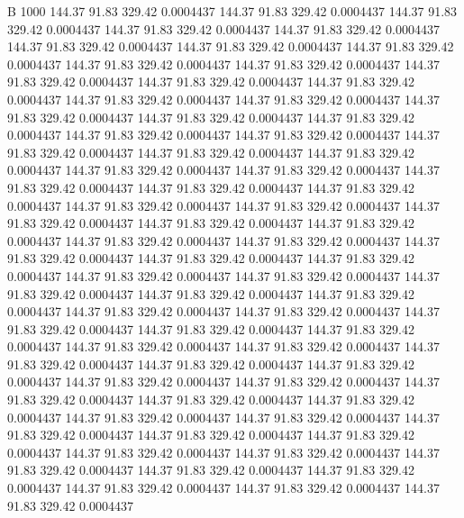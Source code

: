 


B 1000
 144.37   91.83  329.42   0.0004437
 144.37   91.83  329.42   0.0004437
 144.37   91.83  329.42   0.0004437
 144.37   91.83  329.42   0.0004437
 144.37   91.83  329.42   0.0004437
 144.37   91.83  329.42   0.0004437
 144.37   91.83  329.42   0.0004437
 144.37   91.83  329.42   0.0004437
 144.37   91.83  329.42   0.0004437
 144.37   91.83  329.42   0.0004437
 144.37   91.83  329.42   0.0004437
 144.37   91.83  329.42   0.0004437
 144.37   91.83  329.42   0.0004437
 144.37   91.83  329.42   0.0004437
 144.37   91.83  329.42   0.0004437
 144.37   91.83  329.42   0.0004437
 144.37   91.83  329.42   0.0004437
 144.37   91.83  329.42   0.0004437
 144.37   91.83  329.42   0.0004437
 144.37   91.83  329.42   0.0004437
 144.37   91.83  329.42   0.0004437
 144.37   91.83  329.42   0.0004437
 144.37   91.83  329.42   0.0004437
 144.37   91.83  329.42   0.0004437
 144.37   91.83  329.42   0.0004437
 144.37   91.83  329.42   0.0004437
 144.37   91.83  329.42   0.0004437
 144.37   91.83  329.42   0.0004437
 144.37   91.83  329.42   0.0004437
 144.37   91.83  329.42   0.0004437
 144.37   91.83  329.42   0.0004437
 144.37   91.83  329.42   0.0004437
 144.37   91.83  329.42   0.0004437
 144.37   91.83  329.42   0.0004437
 144.37   91.83  329.42   0.0004437
 144.37   91.83  329.42   0.0004437
 144.37   91.83  329.42   0.0004437
 144.37   91.83  329.42   0.0004437
 144.37   91.83  329.42   0.0004437
 144.37   91.83  329.42   0.0004437
 144.37   91.83  329.42   0.0004437
 144.37   91.83  329.42   0.0004437
 144.37   91.83  329.42   0.0004437
 144.37   91.83  329.42   0.0004437
 144.37   91.83  329.42   0.0004437
 144.37   91.83  329.42   0.0004437
 144.37   91.83  329.42   0.0004437
 144.37   91.83  329.42   0.0004437
 144.37   91.83  329.42   0.0004437
 144.37   91.83  329.42   0.0004437
 144.37   91.83  329.42   0.0004437
 144.37   91.83  329.42   0.0004437
 144.37   91.83  329.42   0.0004437
 144.37   91.83  329.42   0.0004437
 144.37   91.83  329.42   0.0004437
 144.37   91.83  329.42   0.0004437
 144.37   91.83  329.42   0.0004437
 144.37   91.83  329.42   0.0004437
 144.37   91.83  329.42   0.0004437
 144.37   91.83  329.42   0.0004437
 144.37   91.83  329.42   0.0004437
 144.37   91.83  329.42   0.0004437
 144.37   91.83  329.42   0.0004437
 144.37   91.83  329.42   0.0004437
 144.37   91.83  329.42   0.0004437
 144.37   91.83  329.42   0.0004437
 144.37   91.83  329.42   0.0004437
 144.37   91.83  329.42   0.0004437
 144.37   91.83  329.42   0.0004437
 144.37   91.83  329.42   0.0004437
 144.37   91.83  329.42   0.0004437
